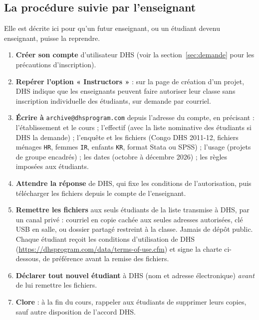 \documentclass[11pt]{article}
\begin{document}
\subsection*{La procédure suivie par l'enseignant}
Elle est décrite ici pour qu'un futur enseignant, ou un étudiant devenu enseignant, puisse la reprendre.
\begin{enumerate}
  \item \textbf{Créer son compte} d'utilisateur DHS (voir la section~\ref{sec:demande} pour les précautions d'inscription).
  \item \textbf{Repérer l'option « Instructors »} : sur la page de création d'un projet, DHS indique que les enseignants peuvent faire autoriser leur classe sans inscription individuelle des étudiants, sur demande par courriel.
  \item \textbf{Écrire à} \texttt{archive@dhsprogram.com} depuis l'adresse du compte, en précisant : l'établissement et le cours ; l'effectif (avec la liste nominative des étudiants si DHS la demande) ; l'enquête et les fichiers (Congo DHS 2011-12, fichiers ménages \texttt{HR}, femmes \texttt{IR}, enfants \texttt{KR}, format Stata ou SPSS) ; l'usage (projets de groupe encadrés) ; les dates (octobre à décembre 2026) ; les règles imposées aux étudiants.
  \item \textbf{Attendre la réponse} de DHS, qui fixe les conditions de l'autorisation, puis télécharger les fichiers depuis le compte de l'enseignant.
  \item \textbf{Remettre les fichiers} aux seuls étudiants de la liste transmise à DHS, par un canal privé : courriel en copie cachée aux seules adresses autorisées, clé USB en salle, ou dossier partagé restreint à la classe. Jamais de dépôt public. Chaque étudiant reçoit les conditions d'utilisation de DHS (\url{https://dhsprogram.com/data/terms-of-use.cfm}) et signe la charte ci-dessous, de préférence avant la remise des fichiers.
  \item \textbf{Déclarer tout nouvel étudiant} à DHS (nom et adresse électronique) \emph{avant} de lui remettre les fichiers.
  \item \textbf{Clore} : à la fin du cours, rappeler aux étudiants de supprimer leurs copies, sauf autre disposition de l'accord DHS.
\end{enumerate}
\end{document}
